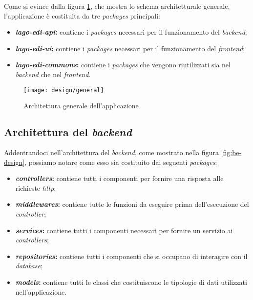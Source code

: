 Come si evince dalla figura \ref{fig:general-design}, che mostra lo schema architetturale generale, l'applicazione è costituita da tre \emph{packages} principali:
\begin{itemize}
  \item \textbf{\emph{lago-edi-api}:} contiene i \emph{packages} necessari per il funzionamento del \emph{\gls{backend}};
  \item \textbf{\emph{lago-edi-ui}:} contiene i \emph{packages} necessari per il funzionamento del \emph{\gls{frontend}};
  \item \textbf{\emph{lago-edi-commons}:} contiene i \emph{packages} che vengono riutilizzati sia nel \emph{\gls{backend}} che nel \emph{\gls{frontend}}.
\end{itemize}

\begin{figure}[!ht]
  \begin{center}
    \texttt{[image: design/general]}
    \caption{Architettura generale dell'applicazione}
    \label{fig:general-design}
  \end{center}
\end{figure}

\subsection{Architettura del \emph{\gls{backend}}}
Addentrandoci nell'architettura del \emph{\gls{backend}}, come mostrato nella figura \ref{fig:be-design}, possiamo notare come esso sia costituito dai seguenti \emph{packages}:
\begin{itemize}
  \item \textbf{\emph{controllers}:} contiene tutti i componenti per fornire una risposta alle richieste \emph{\acrshort{http}};
  \item \textbf{\emph{middlewares}:} contiene tutte le funzioni da eseguire prima dell'esecuzione del \emph{controller};
  \item \textbf{\emph{services}:} contiene tutti i componenti necessari per fornire un servizio ai \emph{controllers};
  \item \textbf{\emph{repositories}:} contiene tutti i componenti che si occupano di interagire con il \emph{database};
  \item \textbf{\emph{models}:} contiene tutti le classi che costituiscono le tipologie di dati utilizzati nell'applicazione.
\end{itemize}

